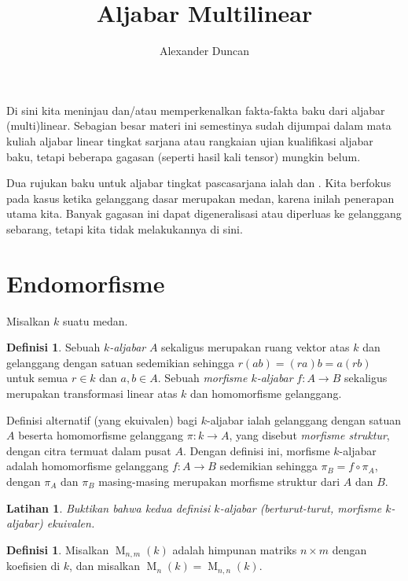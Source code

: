 \documentclass[12pt]{article}
\theoremstyle{plain}
\newtheorem{exercise}[theorem]{Latihan}
\theoremstyle{definition}
\newtheorem{definition}[theorem]{Definisi}
\theoremstyle{remark}
\numberwithin{equation}{section}
\begin{document}
\title{Aljabar Multilinear}
\author{Alexander Duncan}

\maketitle

Di sini kita meninjau dan/atau memperkenalkan fakta-fakta baku dari aljabar
(multi)linear. Sebagian besar materi ini semestinya sudah dijumpai dalam mata
kuliah aljabar linear tingkat sarjana atau rangkaian ujian kualifikasi aljabar
baku, tetapi beberapa gagasan (seperti hasil kali tensor) mungkin belum.

Dua rujukan baku untuk aljabar tingkat pascasarjana ialah
\cite{DF} dan \cite{Lang}. Kita berfokus pada kasus ketika gelanggang dasar
merupakan medan, karena inilah penerapan utama kita.
Banyak gagasan ini dapat digeneralisasi atau diperluas ke gelanggang sebarang,
tetapi kita tidak melakukannya di sini.

\section{Endomorfisme}

Misalkan $k$ suatu medan.

\begin{definition}
Sebuah \emph{$k$-aljabar} $A$ sekaligus merupakan ruang vektor atas $k$ dan
gelanggang dengan satuan sedemikian sehingga $r(ab)=(ra)b=a(rb)$ untuk semua $r \in k$ dan $a,b \in A$.
Sebuah \emph{morfisme $k$-aljabar} $f \colon A \to B$ sekaligus merupakan
transformasi linear atas $k$ dan homomorfisme gelanggang.
\end{definition}

Definisi alternatif (yang ekuivalen) bagi $k$-aljabar ialah gelanggang
dengan satuan $A$ beserta homomorfisme gelanggang $\pi : k \to A$,
yang disebut \emph{morfisme struktur}, dengan citra termuat dalam
pusat $A$. Dengan definisi ini,
morfisme $k$-aljabar adalah homomorfisme gelanggang $f\colon A \to B$ sedemikian
sehingga $\pi_B = f \circ \pi_A$, dengan $\pi_A$ dan $\pi_B$ masing-masing
merupakan morfisme struktur dari $A$ dan $B$.

\begin{exercise}
Buktikan bahwa kedua definisi $k$-aljabar (berturut-turut, morfisme $k$-aljabar)
ekuivalen.
\end{exercise}

\begin{definition}
Misalkan $\operatorname{M}_{n,m}(k)$ adalah himpunan matriks
$n \times m$ dengan koefisien di $k$, dan
misalkan $\operatorname{M}_{n}(k) = \operatorname{M}_{n,n}(k)$. 
\end{definition}
\end{document}
